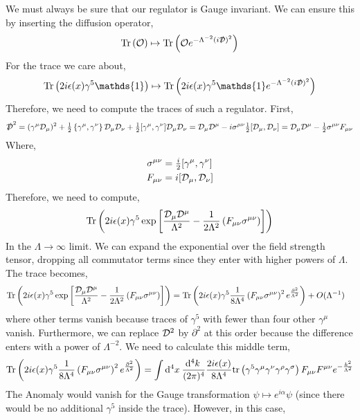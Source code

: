 \documentclass[12pt]{extarticle}
\begin{document}
We must always be sure that our regulator is Gauge invariant. We can ensure this by inserting the diffusion operator,
\[ \mathrm{Tr}\left( \mathcal{O} \right) \mapsto \mathrm{Tr}\left( \mathcal{O} e^{- \Lambda^{-2} (i \slashed{\mathcal{D}})^2} \right) \]
For the trace we care about,
\[ \Tr{2 i \epsilon(x) \gamma^5 \mathds{1}} \mapsto \Tr{2 i \epsilon(x) \gamma^5 \mathds{1} e^{- \Lambda^{-2} (i \slashed{\covD})^2}} \]
Therefore, we need to compute the traces of such a regulator. First,
\[ \slashed{\mathcal{D}}^2 = (\gamma^\mu \mathcal{D}_\mu)^2 + \tfrac{1}{2} \left\{ \gamma^\mu, \gamma^\nu \right\} \mathcal{D}_\mu \mathcal{D}_\nu + \tfrac{1}{2} [\gamma^\mu, \gamma^\nu] \mathcal{D}_\mu \mathcal{D}_\nu = \mathcal{D}_\mu \mathcal{D}^\mu - i \sigma^{\mu \nu} \tfrac{1}{2} [\mathcal{D}_\mu, \mathcal{D}_\nu] = \mathcal{D}_\mu \mathcal{D}^\mu - \tfrac{1}{2} \sigma^{\mu \nu} F_{\mu \nu} \]
Where,
\begin{align*}
\sigma^{\mu \nu} & = \tfrac{i}{2} [\gamma^\mu, \gamma^\nu]
\\
F_{\mu \nu} & = i [\mathcal{D}_\mu, \mathcal{D}_\nu]
\end{align*}
Therefore, we need to compute,
\[ \mathrm{Tr}\left( 2 i \epsilon(x) \gamma^5 \exp{\left[ \frac{\mathcal{D}_\mu \mathcal{D}^\mu}{\Lambda^2} - \frac{1}{2 \Lambda^2} \left( F_{\mu \nu} \sigma^{\mu \nu} \right) \right] } \right) \]
In the $\Lambda \to \infty$ limit. We can expand the exponential over the field strength tensor, dropping all commutator terms since they enter with higher powers of $\Lambda$. The trace becomes,
\begin{align*}
\mathrm{Tr}\left( 2 i \epsilon(x) \gamma^5 \exp{\left[ \frac{\mathcal{D}_\mu \mathcal{D}^\mu}{\Lambda^2} - \frac{1}{2 \Lambda^2} \left( F_{\mu \nu} \sigma^{\mu \nu} \right) \right] } \right) & = \mathrm{Tr}\left( 2 i \epsilon(x) \gamma^5 \frac{1}{8 \Lambda^4} \left( F_{\mu \nu} \sigma^{\mu \nu} \right)^2 e^{\frac{\partial^2}{\Lambda^2}} \right) + O(\Lambda^{-1})
\end{align*}
where other terms vanish because traces of $\gamma^5$ with fewer than four other $\gamma^\mu$ vanish. Furthermore, we can replace $\mathcal{D}^2$ by $\partial^2$ at this order because the difference enters with a power of $\Lambda^{-2}$. We need to calculate this middle term,
\begin{align*}
\mathrm{Tr}\left( 2 i \epsilon(x) \gamma^5 \frac{1}{8 \Lambda^4} \left( F_{\mu \nu} \sigma^{\mu \nu} \right)^2 e^{\frac{\partial^2}{\Lambda^2}} \right) = \int \mathrm{d}^{4} x \: \frac{\mathrm{d}^{4} k \:}{(2\pi)^4} \frac{2 i \epsilon(x)}{8 \Lambda^4} \mathrm{tr} \left( \gamma^5 \gamma^\mu \gamma^\nu \gamma^\rho \gamma^\sigma \right) F_{\mu \nu} F^{\mu \nu} e^{- \frac{k^2}{\Lambda^2}} 
\end{align*}
The Anomaly would vanish  for the Gauge transformation $\psi \mapsto e^{i \alpha} \psi$ (since there would be no additional $\gamma^5$ inside the trace). However, in this case,
\end{document}
